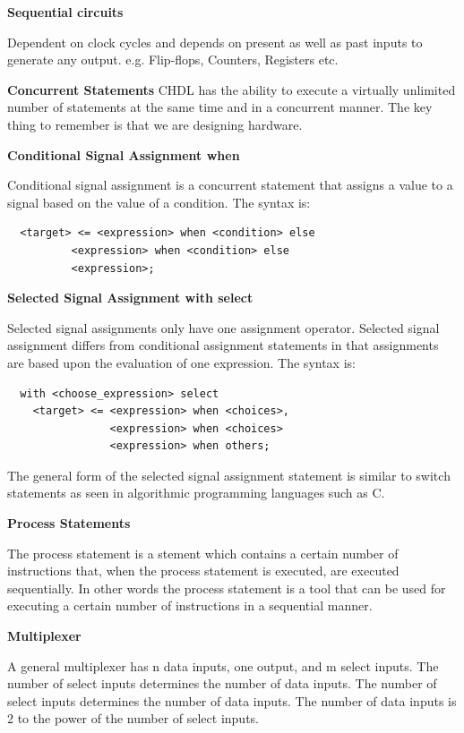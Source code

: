 \textbf{Sequential circuits}

Dependent on clock cycles and depends on present as well as past inputs to generate any output.
e.g. Flip-flops, Counters, Registers etc.


\textbf{Concurrent Statements}
CHDL has the ability to execute a virtually unlimited number of statements at the same time and in a concurrent manner. The key thing to remember is that we are
designing hardware.

\textbf{Conditional Signal Assignment when}

Conditional signal assignment is a concurrent statement that assigns a value to a signal based on the value of a condition. The syntax is:

\begin{verbatim}
  <target> <= <expression> when <condition> else 
          <expression> when <condition> else 
          <expression>;
\end{verbatim}

\textbf{Selected Signal Assignment with select}

Selected signal assignments only have one assignment operator. Selected signal assignment
differs from conditional assignment statements in that assignments are based upon the evaluation
of one expression. The syntax is:

\begin{verbatim}
  with <choose_expression> select
    <target> <= <expression> when <choices>,
                <expression> when <choices>
                <expression> when others;
\end{verbatim}

The general form of the selected signal assignment statement is similar to switch statements
as seen in algorithmic programming languages such as C.

\textbf{Process Statements}

The process statement is a stement which contains a certain number of instructions that, when the process statement
is executed, are executed sequentially. In other words the process statement is a tool that can be used
for executing a certain number of instructions in a sequential manner.

\textbf{Multiplexer}

A general multiplexer has n data inputs, one output, and m select inputs. The number of select inputs determines the number of data inputs. The number of select inputs determines the number of data inputs. The number of data inputs is 2 to the power of the number of select inputs.


